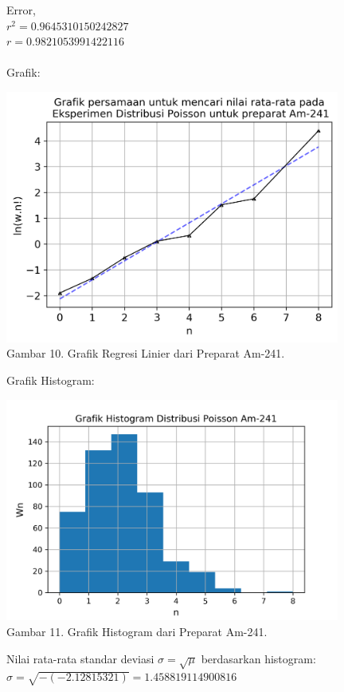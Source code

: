 \documentclass{article}
\begin{document}
			Error,\\
			$r^{2} = 0.9645310150242827$ \\
			$r = 0.9821053991422116$ \\	\\		
			Grafik: 
			\begin{center}
				\includegraphics[width=110mm]{Data/Am-241-Graph.png}\\
				Gambar 10. Grafik Regresi Linier dari Preparat Am-241.
			\end{center} \newpage
			Grafik Histogram:
			\begin{center}
				\includegraphics[width=110mm]{Data/Am-241.png}\\
				Gambar 11. Grafik Histogram dari Preparat Am-241.
			\end{center}
			Nilai rata-rata standar deviasi $\sigma = \sqrt{\mu}$ berdasarkan histogram:\\			
			$\sigma = \sqrt{-(-2.12815321)} = 1.458819114900816$
			
\end{document}
